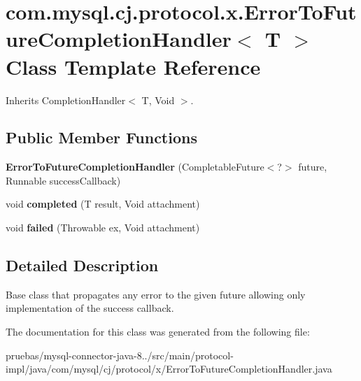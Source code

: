 \hypertarget{classcom_1_1mysql_1_1cj_1_1protocol_1_1x_1_1_error_to_future_completion_handler}{}\section{com.\+mysql.\+cj.\+protocol.\+x.\+Error\+To\+Future\+Completion\+Handler$<$ T $>$ Class Template Reference}
\label{classcom_1_1mysql_1_1cj_1_1protocol_1_1x_1_1_error_to_future_completion_handler}


Inherits Completion\+Handler$<$ T, Void $>$.

\subsection*{Public Member Functions}
\begin{DoxyCompactItemize}
\item 
\mbox{\label{classcom_1_1mysql_1_1cj_1_1protocol_1_1x_1_1_error_to_future_completion_handler_a8cc938c3d98024b23ca6466064e6f13f}} 
{\bfseries Error\+To\+Future\+Completion\+Handler} (Completable\+Future$<$?$>$ future, Runnable success\+Callback)
\item 
\mbox{\label{classcom_1_1mysql_1_1cj_1_1protocol_1_1x_1_1_error_to_future_completion_handler_adeccf1e0e505f757456485c7773f72fc}} 
void {\bfseries completed} (T result, Void attachment)
\item 
\mbox{\label{classcom_1_1mysql_1_1cj_1_1protocol_1_1x_1_1_error_to_future_completion_handler_a2fd335c55b05e10109894b888d27c5df}} 
void {\bfseries failed} (Throwable ex, Void attachment)
\end{DoxyCompactItemize}


\subsection{Detailed Description}
Base class that propagates any error to the given future allowing only implementation of the success callback. 

The documentation for this class was generated from the following file\+:\begin{DoxyCompactItemize}
\item 
pruebas/mysql-\/connector-\/java-\/8../src/main/protocol-\/impl/java/com/mysql/cj/protocol/x/Error\+To\+Future\+Completion\+Handler.\+java\end{DoxyCompactItemize}
